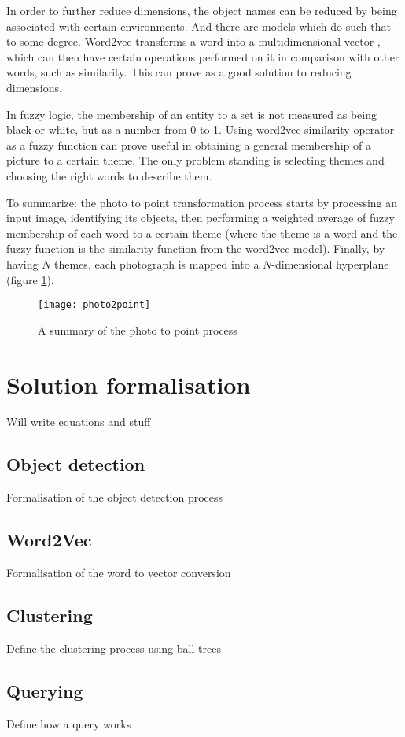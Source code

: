In order to further reduce dimensions, the object names can be reduced by being associated with certain environments. And there are models which do such that to some degree. Word2vec transforms a word into a multidimensional vector \cite{word2vec}, which can then have certain operations performed on it in comparison with other words, such as similarity. This can prove as a good solution to reducing dimensions.

In fuzzy logic, the membership of an entity to a set is not measured as being black or white, but as a number from 0 to 1. Using word2vec similarity operator as a fuzzy function can prove useful in obtaining a general membership of a picture to a certain theme. The only problem standing is selecting themes and choosing the right words to describe them.

To summarize: the photo to point transformation process starts by processing an input image, identifying its objects, then performing a weighted average of fuzzy membership of each word to a certain theme (where the theme is a word and the fuzzy function is the similarity function from the word2vec model). Finally, by having $N$ themes, each photograph is mapped into a $N$-dimensional hyperplane (figure \ref{fig:photo2point}).

\begin{figure}[b!]
\centering
\texttt{[image: photo2point]}
\caption{A summary of the photo to point process}
\label{fig:photo2point}
\end{figure}

\section{Solution formalisation}
\label{sec:approach_formal}

Will write equations and stuff

\subsection{Object detection}
\label{subsec:approach_formal_obj}

Formalisation of the object detection process

\subsection{Word2Vec}
\label{subsec:approach_formal_word2vec}

Formalisation of the word to vector conversion

\subsection{Clustering}
\label{subsec:approach_formal_cluster}

Define the clustering process using ball trees

\subsection{Querying}
\label{subsec:approach_formal_query}

Define how a query works